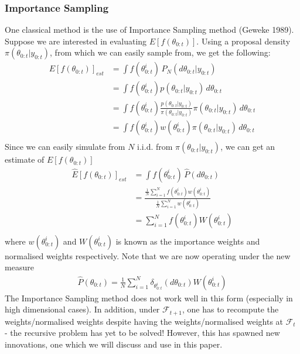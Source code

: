 \documentclass[12pt]{article}
\theoremstyle{definition}
\begin{document}
\subsubsection{Importance Sampling}
One classical method is the use of Importance Sampling method (Geweke 1989). Suppose we are interested in evaluating $E[f(\theta_{0:t})]$. Using a proposal density $\pi(\theta_{0:t}|y_{0:t})$, from which we can easily sample from, we get the following:
\begin{equation}
	\begin{aligned}
		E[f(\theta_{0:t})]_{est} &= \int f(\theta_{0:t}^{i}) \,P_{N}(d\theta_{0:t}|y_{0:t}) \\
		&= \int f(\theta_{0:t}^{i})p(\theta_{0:t}|y_{0:t}) \,d\theta_{0:t} \\
		&= \int f(\theta_{0:t}^{i})\frac{p(\theta_{0:t}|y_{0:t})}{\pi(\theta_{0:t}|y_{0:t})}\pi(\theta_{0:t}|y_{0:t})\,d\theta_{0:t} \\
		&= \int f(\theta_{0:t}^{i})w(\theta_{0:t}^{i})\pi(\theta_{0:t}|y_{0:t})\,d\theta_{0:t} \\
	\end{aligned}
\end{equation}
Since we can easily simulate from $N$ i.i.d. from $\pi(\theta_{0:t}|y_{0:t})$, we can get an estimate of $E[f(\theta_{0:t})]$
\begin{equation}
	\begin{aligned}
		\hat{E}[f(\theta_{0:t})]_{est} &= \int f(\theta_{0:t}^{i})\,\hat{P}(d\theta_{0:t}) \\
		&=\frac{\frac{1}{N}\sum_{i=1}^{N}f(\theta_{0:t}^{i})w(\theta_{0:t}^{i})}{\frac{1}{N}\sum_{i=1}^{N}w(\theta_{0:t}^{i})} \\
		&= \sum_{i=1}^{N}f(\theta_{0:t}^{i})W(\theta_{0:t}^{i}) \\
	\end{aligned}
\end{equation}
where $w(\theta_{0:t}^{i})$ and $W(\theta_{0:t}^{i})$ is known as the importance weights and normalised weights respectively. Note that we are now operating under the new measure 
\begin{equation}
	\begin{aligned}
		\hat{P}(\theta_{0:t}) = \frac{1}{N}\sum_{i=1}^{N}\delta_{\theta_{0:t}^{i}}(d\theta_{0:t})W(\theta_{0:t}^{i})
	\end{aligned}
\end{equation}
The Importance Sampling method does not work well in this form (especially in high dimensional cases). In addition, under $\mathcal{F}_{t+1}$, one has to recompute the weights/normalised weights despite having the weights/normalised weights at $\mathcal{F}_{t}$ - the recursive problem has yet to be solved! However, this has spawned new innovations, one which we will discuss and use in this paper.
\end{document}
